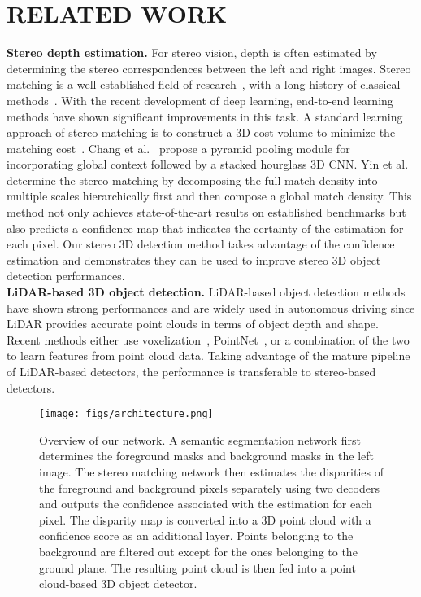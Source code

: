 \documentclass[letterpaper, 10 pt, conference]{ieeeconf}
\begin{document}
\section{RELATED WORK}\label{related_work}
\noindent \textbf{Stereo depth estimation.}
For stereo vision, depth is often estimated by determining the stereo correspondences between the left and right images. Stereo matching is a well-established field of research~\cite{scharstein2002taxonomy}, with a long history of classical methods~\cite{tola2008fast, ohta1985stereo, kolmogorov2001computing}. With the recent development of deep learning, end-to-end learning methods have shown significant improvements in this task. A standard learning approach of stereo matching is to construct a 3D cost volume to minimize the matching cost~\cite{chang2018psmnet, zhang2019ganet, yin2019hd3}. Chang et al.~\cite{chang2018psmnet} propose a pyramid pooling module for incorporating global context followed by a stacked hourglass 3D CNN. Yin et al.~\cite{yin2019hd3} determine the stereo matching by decomposing the full match density into multiple scales hierarchically first and then compose a global match density. This method not only achieves state-of-the-art results on established benchmarks but also predicts a confidence map that indicates the certainty of the estimation for each pixel. Our stereo 3D detection method takes advantage of the confidence estimation and demonstrates they can be used to improve stereo 3D object detection performances. \\

\noindent \textbf{LiDAR-based 3D object detection.}
LiDAR-based object detection methods have shown strong performances and are widely used in autonomous driving since LiDAR provides accurate point clouds in terms of object depth and shape. Recent methods either use voxelization~\cite{chen2017multi, ku2018joint, zhou2018voxelnet, yan2018second}, PointNet~\cite{qi2018frustum, shi2019pointrcnn}, or a combination of the two~\cite{chen2019fast, shi2019pv,lang2019pointpillars} to learn features from point cloud data. Taking advantage of the mature pipeline of LiDAR-based detectors, the performance is transferable to stereo-based detectors.\\
\begin{figure*}[t!]
	\begin{center}
		\texttt{[image: figs/architecture.png]}
	\end{center}
	\caption{Overview of our network. A semantic segmentation network first determines the foreground masks and background masks in the left image. The stereo matching network then estimates the disparities of the foreground and background pixels separately using two decoders and outputs the confidence associated with the estimation for each pixel. The disparity map is converted into a 3D point cloud with a confidence score as an additional layer.  Points belonging to the background are filtered out except for the ones belonging to the ground plane. The resulting point cloud is then fed into a point cloud-based 3D object detector.}
	\label{fig:architecture}
\end{figure*}
\end{document}
